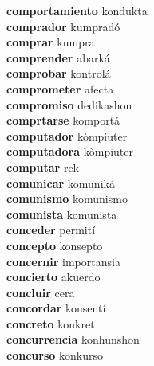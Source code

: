 \textbf{comportamiento } kondukta \\
\textbf{comprador } kumpradó \\
\textbf{comprar } kumpra \\
\textbf{comprender } abarká \\
\textbf{comprobar } kontrolá \\
\textbf{comprometer } afecta \\
\textbf{compromiso } dedikashon \\
\textbf{comprtarse } komportá \\
\textbf{computador } kòmpiuter \\
\textbf{computadora } kòmpiuter \\
\textbf{computar } rek \\
\textbf{comunicar } komuniká \\
\textbf{comunismo } komunismo \\
\textbf{comunista } komunista \\
\textbf{conceder } permití \\
\textbf{concepto } konsepto \\
\textbf{concernir } importansia \\
\textbf{concierto } akuerdo \\
\textbf{concluir } cera \\
\textbf{concordar } konsentí \\
\textbf{concreto } konkret \\
\textbf{concurrencia } konhunshon \\
\textbf{concurso } konkurso \\
